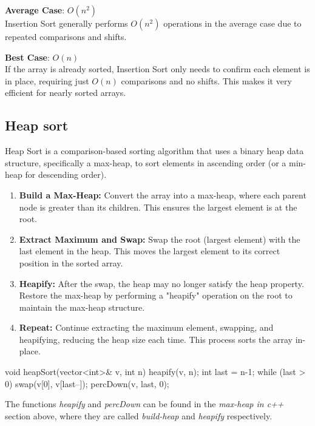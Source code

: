 \documentclass{report}
\begin{document}
\bigbreak \noindent 
\textbf{Average Case}: \( O(n^2) \) \\
\bigbreak \noindent 
Insertion Sort generally performs \( O(n^2) \) operations in the average case due to repeated comparisons and shifts.

\bigbreak \noindent 
\textbf{Best Case}: \( O(n) \) \\
\bigbreak \noindent 
If the array is already sorted, Insertion Sort only needs to confirm each element is in place, requiring just \( O(n) \) comparisons and no shifts. This makes it very efficient for nearly sorted arrays.







\pagebreak \bigbreak \noindent 
\subsection{Heap sort}
\bigbreak \noindent 
Heap Sort is a comparison-based sorting algorithm that uses a binary heap data structure, specifically a max-heap, to sort elements in ascending order (or a min-heap for descending order).
\bigbreak \noindent 
\begin{enumerate}
    \item \textbf{Build a Max-Heap:} Convert the array into a max-heap, where each parent node is greater than its children. This ensures the largest element is at the root.
    \item \textbf{Extract Maximum and Swap:} Swap the root (largest element) with the last element in the heap. This moves the largest element to its correct position in the sorted array.
    \item \textbf{Heapify:} After the swap, the heap may no longer satisfy the heap property. Restore the max-heap by performing a "heapify" operation on the root to maintain the max-heap structure.
    \item \textbf{Repeat:} Continue extracting the maximum element, swapping, and heapifying, reducing the heap size each time. This process sorts the array in-place.
\end{enumerate}
\bigbreak \noindent 
\begin{cppcode}
    void heapSort(vector<int>& v, int n) {
        heapify(v, n);
        int last = n-1;
        while (last > 0) {
            swap(v[0], v[last--]);
            percDown(v, last, 0);
        }
    }
\end{cppcode}
\bigbreak \noindent 
The functions \textit{heapify} and \textit{percDown} can be found in the \textit{max-heap in c++} section above, where they are called \textit{build-heap} and \textit{heapify} respectively.
\bigbreak \noindent 
\end{document}
